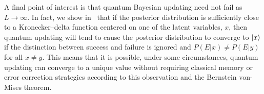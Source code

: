 \documentclass[aps,amsmath,onecolumn,amssymb]{revtex4}
\begin{document}
A final point of interest is that quantum Bayesian updating need not fail as $L\rightarrow \infty$.  In fact, we show in~ that if the posterior distribution is sufficiently close to a Kronecker--delta function centered on one of the latent variables, $x$, then quantum updating will tend to cause the posterior distribution to converge to $\left|x\right\rangle$ if the distinction between success and failure is ignored and $P(E|x)\ne P(E|y)$ for all $x\ne y$.  This means that it is possible, under some circumstances, quantum updating can converge to a unique value without requiring classical memory or error correction strategies according to this observation and the Bernstein von-Mises theorem.


%

\end{document}
